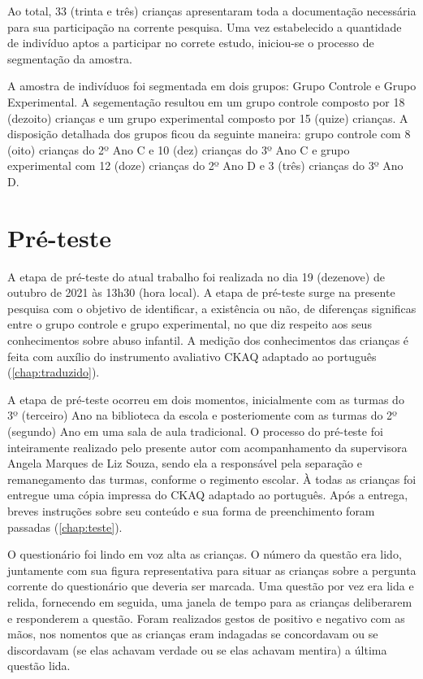 Ao total, 33 (trinta e três) crianças apresentaram toda a documentação necessária para sua participação na corrente pesquisa. Uma vez estabelecido a quantidade de indivíduo aptos a participar no correte estudo, iniciou-se o processo de segmentação da amostra. 

A amostra de indivíduos foi segmentada em dois grupos: Grupo Controle e Grupo Experimental. A segementação resultou em um grupo controle composto por 18 (dezoito) crianças e um grupo experimental composto por 15 (quize) crianças. A disposição detalhada dos grupos ficou da seguinte maneira: grupo controle com 8 (oito) crianças do 2º Ano C e 10 (dez) crianças do 3º Ano C e grupo experimental com 12 (doze) crianças do 2º Ano D e 3 (três) crianças do 3º Ano D.


\section{Pré-teste}\label{sec:pretes}

A etapa de pré-teste do atual trabalho foi realizada no dia 19 (dezenove) de outubro de 2021 às 13h30 (hora local). A etapa de pré-teste surge na presente pesquisa com o objetivo de identificar, a existência ou não, de diferenças significas entre o grupo controle e grupo experimental, no que diz respeito aos seus conhecimentos sobre abuso infantil. A medição dos conhecimentos das crianças é feita com auxílio do instrumento avaliativo \acf{CKAQ} adaptado ao português (\autoref{chap:traduzido}). 

A etapa de pré-teste ocorreu em dois momentos, inicialmente com as turmas do 3º (terceiro) Ano na biblioteca da escola e posteriomente com as turmas do 2º (segundo) Ano em uma sala de aula tradicional. O processo do pré-teste foi inteiramente realizado pelo presente autor com acompanhamento da supervisora Angela Marques de Liz Souza, sendo ela a responsável pela separação e remanegamento das turmas, conforme o regimento escolar. À todas as crianças foi entregue uma cópia impressa do \ac{CKAQ} adaptado ao português. Após a entrega, breves instruções sobre seu conteúdo e sua forma de preenchimento foram passadas (\autoref{chap:teste}). %

O questionário foi lindo em voz alta as crianças. O número da questão era lido, juntamente com sua figura representativa para situar as crianças sobre a pergunta corrente do questionário que deveria ser marcada. Uma questão por vez era lida e relida, fornecendo em seguida, uma janela de tempo para as crianças deliberarem e responderem a questão. Foram realizados gestos de positivo e negativo com as mãos, nos nomentos que as crianças eram indagadas se concordavam ou se discordavam (se elas achavam verdade ou se elas achavam mentira) a última questão lida.

